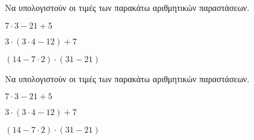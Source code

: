 Να υπολογιστούν οι τιμές των παρακάτω αριθμητικών παραστάσεων.
\begin{rlist}
\item $ 7\cdot3-21+5 $
\item $ 3\cdot(3\cdot4-12)+7 $
\item $ (14-7\cdot2)\cdot(31-21) $
\end{rlist}
Να υπολογιστούν οι τιμές των παρακάτω αριθμητικών παραστάσεων.
\begin{rlist}
\item $ 7\cdot3-21+5 $
\item $ 3\cdot(3\cdot4-12)+7 $
\item $ (14-7\cdot2)\cdot(31-21) $
\end{rlist}
